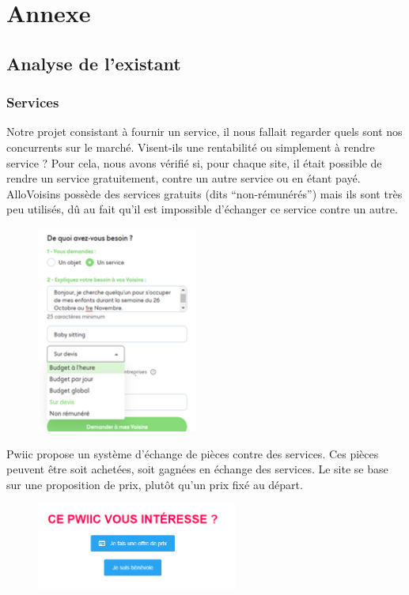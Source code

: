 \documentclass[a4paper,11pt]{article}
\begin{document}
\section{Annexe}

\subsection{Analyse de l'existant}

\subsubsection{Services}

Notre projet consistant à fournir un service, il nous fallait regarder quels sont nos concurrents sur le marché.
Visent-ils une rentabilité ou simplement à rendre service ? Pour cela, nous avons vérifié si, pour chaque site,
il était possible de rendre un service gratuitement, contre un autre service ou en étant payé.\\

AlloVoisins possède des services gratuits (dits “non-rémunérés”) mais ils sont très peu utilisés,
dû au fait qu’il est impossible d’échanger ce service contre un autre.\\

\begin{figure}[H]
  \includegraphics[width=200px]{images/services-allovoisins.png}
  \label{fig:services-allovoisins}
\end{figure}

Pwiic propose un système d’échange de pièces contre des services. Ces pièces peuvent être soit achetées,
soit gagnées en échange des services. Le site se base sur une proposition de prix, plutôt qu’un prix fixé au départ.\\

\begin{figure}[H]
  \includegraphics[width=250px]{images/pieces-pwiic.png}
  \label{fig:pieces-pwiic}
\end{figure}
\end{document}

